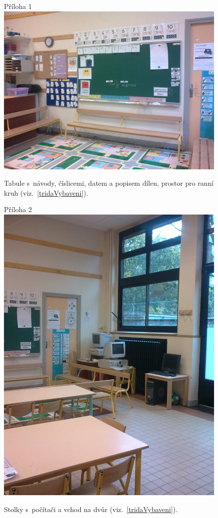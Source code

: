 	\begin{figure}[tb]
		\centering
		Příloha 1\\
		\includegraphics[height = 0.35\textheight]{./fotky/Obr1.jpg}
		\caption{
			Tabule s~návody, číslicemi, datem a popisem dílen, prostor pro ranní kruh (viz.~\ref{tridaVybaveni}).
		}
		\label{Obr1}
	\end{figure}

	\begin{figure}[tb]
		\centering
		Příloha 2\\
		\includegraphics[height = 0.35\textheight]{./fotky/Obr2.jpg}
		\caption{
			Stolky s~počítači a vchod na dvůr (viz.~\ref{tridaVybaveni}).
		}
		\label{Obr2}
	\end{figure}

